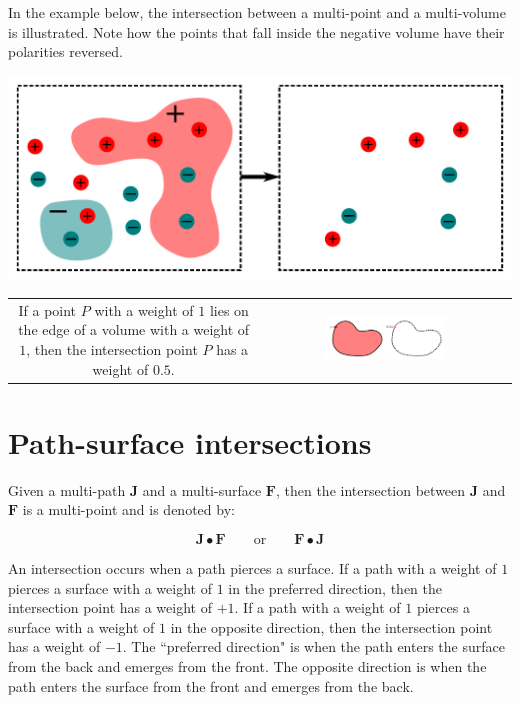 In the example below, the intersection between a multi-point and a multi-volume is illustrated. Note how the points that fall inside the negative volume have their polarities reversed. 

\begin{center}
\includegraphics[scale = 0.4]{Intersections/Point-volume_intersections/point_volume_intersections_two_panel_example}
\end{center}

\begin{tabular}{cc}
\parbox{0.5\textwidth}{
If a point \(P\) with a weight of \(1\) lies on the edge of a volume with a weight of \(1\), then the intersection point \(P\) has a weight of \(0.5\).
} & \parbox{0.5\textwidth}{
\includegraphics[width = 0.5\textwidth]{Intersections/Point-volume_intersections/point_volume_intersection_boundary_case}
}
\end{tabular}





\section{Path-surface intersections}

Given a multi-path \(\mathbf{J}\) and a multi-surface \(\mathbf{F}\), then the intersection between \(\mathbf{J}\) and \(\mathbf{F}\) is a multi-point and is denoted by:

\[\mathbf{J} \bullet \mathbf{F} \quad\quad\text{or}\quad\quad \mathbf{F} \bullet \mathbf{J}\]

An intersection occurs when a path pierces a surface. If a path with a weight of \(1\) pierces a surface with a weight of \(1\) in the preferred direction, then the intersection point has a weight of \(+1\). If a path with a weight of \(1\) pierces a surface with a weight of \(1\) in the opposite direction, then the intersection point has a weight of \(-1\). The ``preferred direction" is when the path enters the surface from the back and emerges from the front. The opposite direction is when the path enters the surface from the front and emerges from the back.

